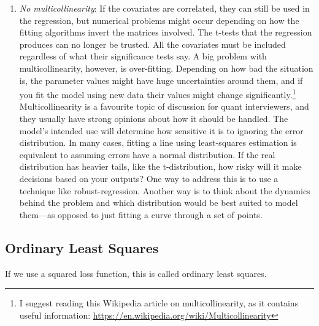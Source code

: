 \documentclass{article}
\begin{document}
\begin{enumerate}
      \item \textit{No multicollinearity}: If the covariates are correlated, they can still be used in the regression, but numerical problems might occur depending on how the fitting algorithms invert the matrices involved. The t-tests that the regression produces can no longer be trusted. All the covariates must be included regardless of what their significance tests say.
      A big problem with multicollinearity, however, is over-fitting.
      Depending on how bad the situation is, the parameter values might have huge uncertainties around them, and if you fit the model using new data their values might change significantly.\footnote{I suggest reading this Wikipedia article on multicollinearity, as it contains useful information: \url{https://en.wikipedia.org/wiki/Multicollinearity}} Multicollinearity is a favourite topic of discussion for quant interviewers, and they usually have strong opinions about how it should be handled. The model's intended use will determine how sensitive it is to ignoring the error distribution. In many cases, fitting a line using least-squares estimation is equivalent to assuming errors have a normal distribution. If the real distribution has heavier tails, like the t-distribution, how risky will it make decisions based on your outputs? One way to address this is to use a technique like robust-regression. Another way is to think about the dynamics behind the problem and which distribution would be best suited to model them---as opposed to just fitting a curve through a set of points.
    \end{enumerate}

  \subsection{Ordinary Least Squares}

    If we use a squared loss function, this is called ordinary least squares. 
\end{document}
